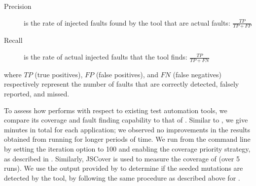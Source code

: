 \begin{description}
\item[Precision] is the rate of injected faults found by the tool that are actual faults: $\frac{\mathit{TP}}{\mathit{TP} + \mathit{FP}}$
\item[Recall] is the rate of actual injected faults that the tool finds: $\frac{\mathit{TP}}{\mathit{TP} + \mathit{FN}}$ 
\end{description}
where $\textit{TP}$ (true positives), $\textit{FP}$ (false positives), and $\textit{FN}$ (false negatives) respectively represent the number of faults that are correctly detected, falsely reported, and missed.

 \label{comparison-setup}
To assess how \jseft performs with respect to existing \javascript test automation tools, we compare its coverage and fault finding capability to that of \artemis \cite{artzi:icse11}.  
Similar to \jseft, we give  minutes in total for each application; we observed no improvements in the results obtained from running \artemis for longer periods of time. 
We run \artemis from the command line by setting the iteration option to 100 and enabling the coverage priority strategy, as described in \cite{artzi:icse11}. %
Similarly, JSCover is used to measure the coverage of \artemis (over 5 runs).
We use the output provided by \artemis to determine if the seeded mutations are detected by the tool, by following the same procedure as described above for \jseft. 



%
%


  

